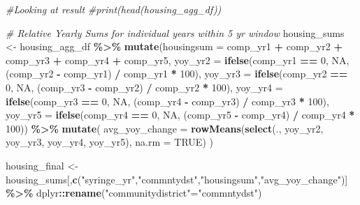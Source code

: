 \documentclass[
]{article}
\newenvironment{Shaded}{\begin{snugshade}}{\end{snugshade}}
\newcommand{\AttributeTok}[1]{\textcolor[rgb]{0.13,0.29,0.53}{#1}}
\newcommand{\CommentTok}[1]{\textcolor[rgb]{0.56,0.35,0.01}{\textit{#1}}}
\newcommand{\ConstantTok}[1]{\textcolor[rgb]{0.56,0.35,0.01}{#1}}
\newcommand{\DecValTok}[1]{\textcolor[rgb]{0.00,0.00,0.81}{#1}}
\newcommand{\FunctionTok}[1]{\textcolor[rgb]{0.13,0.29,0.53}{\textbf{#1}}}
\newcommand{\NormalTok}[1]{#1}
\newcommand{\OtherTok}[1]{\textcolor[rgb]{0.56,0.35,0.01}{#1}}
\newcommand{\SpecialCharTok}[1]{\textcolor[rgb]{0.81,0.36,0.00}{\textbf{#1}}}
\newcommand{\StringTok}[1]{\textcolor[rgb]{0.31,0.60,0.02}{#1}}
\begin{document}
\begin{Shaded}
\begin{Highlighting}[]
\CommentTok{\#Looking at result}
\CommentTok{\#print(head(housing\_agg\_df))}

\CommentTok{\# Relative Yearly Sums for individual years within 5 yr window}
\NormalTok{housing\_sums }\OtherTok{\textless{}{-}}\NormalTok{ housing\_agg\_df }\SpecialCharTok{\%\textgreater{}\%}
  \FunctionTok{mutate}\NormalTok{(}\AttributeTok{housingsum =}\NormalTok{ comp\_yr1 }\SpecialCharTok{+}\NormalTok{ comp\_yr2 }\SpecialCharTok{+}\NormalTok{ comp\_yr3 }\SpecialCharTok{+}\NormalTok{ comp\_yr4 }\SpecialCharTok{+}\NormalTok{ comp\_yr5,}
    \AttributeTok{yoy\_yr2 =} \FunctionTok{ifelse}\NormalTok{(comp\_yr1 }\SpecialCharTok{==} \DecValTok{0}\NormalTok{, }\ConstantTok{NA}\NormalTok{, (comp\_yr2 }\SpecialCharTok{{-}}\NormalTok{ comp\_yr1) }\SpecialCharTok{/}\NormalTok{ comp\_yr1 }\SpecialCharTok{*} \DecValTok{100}\NormalTok{),}
    \AttributeTok{yoy\_yr3 =} \FunctionTok{ifelse}\NormalTok{(comp\_yr2 }\SpecialCharTok{==} \DecValTok{0}\NormalTok{, }\ConstantTok{NA}\NormalTok{, (comp\_yr3 }\SpecialCharTok{{-}}\NormalTok{ comp\_yr2) }\SpecialCharTok{/}\NormalTok{ comp\_yr2 }\SpecialCharTok{*} \DecValTok{100}\NormalTok{),}
    \AttributeTok{yoy\_yr4 =} \FunctionTok{ifelse}\NormalTok{(comp\_yr3 }\SpecialCharTok{==} \DecValTok{0}\NormalTok{, }\ConstantTok{NA}\NormalTok{, (comp\_yr4 }\SpecialCharTok{{-}}\NormalTok{ comp\_yr3) }\SpecialCharTok{/}\NormalTok{ comp\_yr3 }\SpecialCharTok{*} \DecValTok{100}\NormalTok{),}
    \AttributeTok{yoy\_yr5 =} \FunctionTok{ifelse}\NormalTok{(comp\_yr4 }\SpecialCharTok{==} \DecValTok{0}\NormalTok{, }\ConstantTok{NA}\NormalTok{, (comp\_yr5 }\SpecialCharTok{{-}}\NormalTok{ comp\_yr4) }\SpecialCharTok{/}\NormalTok{ comp\_yr4 }\SpecialCharTok{*} \DecValTok{100}\NormalTok{)) }\SpecialCharTok{\%\textgreater{}\%}
  \FunctionTok{mutate}\NormalTok{(}
    \AttributeTok{avg\_yoy\_change =} \FunctionTok{rowMeans}\NormalTok{(}\FunctionTok{select}\NormalTok{(., yoy\_yr2, yoy\_yr3, yoy\_yr4, yoy\_yr5), }\AttributeTok{na.rm =} \ConstantTok{TRUE}\NormalTok{)}
\NormalTok{  )}

\NormalTok{housing\_final }\OtherTok{\textless{}{-}}\NormalTok{housing\_sums[,}\FunctionTok{c}\NormalTok{(}\StringTok{"syringe\_yr"}\NormalTok{,}\StringTok{"commntydst"}\NormalTok{,}\StringTok{"housingsum"}\NormalTok{,}\StringTok{"avg\_yoy\_change"}\NormalTok{)] }\SpecialCharTok{\%\textgreater{}\%}
\NormalTok{                dplyr}\SpecialCharTok{::}\FunctionTok{rename}\NormalTok{(}\StringTok{"communitydistrict"}\OtherTok{=}\StringTok{"commntydst"}\NormalTok{)}
\end{Highlighting}
\end{Shaded}
\end{document}
